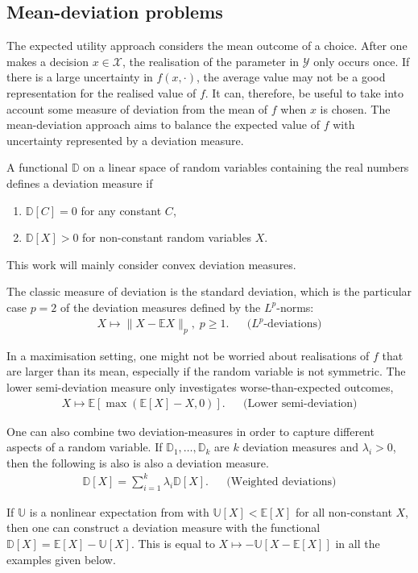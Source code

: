 \documentclass[main.tex]{subfiles}
\begin{document}
\subsection{Mean-deviation problems}
The expected utility approach considers the mean outcome of a choice.
After one makes a decision $x\in\mathcal{X}$, the realisation of the
parameter in $\mathcal{Y}$ only occurs once. If there is a large
uncertainty in $f(x,\cdot)$, the average value may not be a good
representation for the realised value of $f$.
It can, therefore, be useful to take into account some measure of
deviation from the mean of $f$ when $x$ is chosen.
The mean-deviation approach aims to balance the expected value of $f$
with uncertainty represented by a deviation measure.
\begin{mydef}
  A functional $\mathbb{D}$ on a linear space of random
  variables containing the real numbers defines a deviation measure if
  \begin{enumerate}
  \item $\mathbb{D}[C] = 0$ for any constant $C$,
  \item $\mathbb{D}[X]>0$ for non-constant random variables $X$.
  \end{enumerate}
  This work will mainly consider convex deviation measures.
\end{mydef}

\begin{example}
  The classic measure of deviation is the standard deviation, which is
  the  particular case $p=2$ of the deviation measures defined by
  the $L^p$-norms:
  \begin{align}
    X\mapsto \|X-\mathbb{E}X\|_p,\; p\geq 1.
    && \text{($L^p$-deviations)}
  \end{align}

  In a maximisation setting, one might not be worried about
  realisations of $f$ that are larger than its mean, especially if the
  random variable is not symmetric.
  The lower semi-deviation measure only investigates
  worse-than-expected outcomes,
  \begin{align}
    X\mapsto \mathbb{E}[\max(\mathbb{E}[X]-X,0)].
    &&\text{(Lower semi-deviation)}
  \end{align}

  One can also combine two deviation-measures in order to capture
  different aspects of a random variable.
  If $\mathbb{D}_1,\dots,\mathbb{D}_k$ are $k$ deviation measures and
  $\lambda_i>0$, then the following is also
  is also a deviation measure.
  \begin{align}
    \mathbb{D}[X]=\sum_{i=1}^k\lambda_i\mathbb{D}[X].
    &&\text{(Weighted deviations)}
  \end{align}

  If $\mathbb{U}$ is a nonlinear expectation from
   with $\mathbb{U}[X]< \mathbb
  E[X]$ for all non-constant $X$,
  then one can
  construct a deviation measure with the functional
  $\mathbb{D}[X]=\mathbb{E}[X]-\mathbb{U}[X]$.
  This is equal to $X\mapsto -\mathbb{U}[X-\mathbb{E}[X]]$ in all the
  examples given below.
\end{example}
\end{document}

